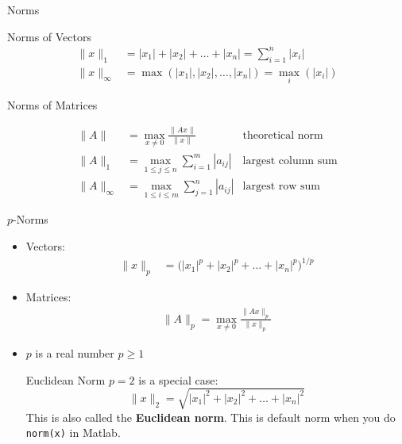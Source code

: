 \documentclass[10pt]{beamer}
\begin{document}
\begin{frame}[shrink]{Norms}

{}

\begin{block}{Norms of Vectors}
\begin{align*}
    \|x\|_{1} &= |x_1| + |x_2| + \ldots + |x_n| = \sum_{i=1}^{n}{|x_i|}\\
    \|x\|_{\infty} &= \max \left(|x_1|, |x_2|, \ldots, |x_n| \right)
                      = \underset{i}{\max} \left( |x_i| \right)
\end{align*}
\end{block}

\begin{block}{Norms of Matrices}
    
\begin{align*}
  \|A\| &= \max_{x\ne 0} \frac{\|Ax\|}{\|x\|} & \text{theoretical norm}\\
  \|A\|_1 &= \max_{1\leq j \leq n} \sum_{i=1}^{m}|a_{ij}| &\text{largest column sum}\\
  \|A\|_{\infty} &= \max_{1\leq i \leq m} \sum_{j=1}^{n}|a_{ij}| &\text{largest row sum}
\end{align*}
\end{block}
\end{frame}
\begin{frame}{$p$-Norms}
\begin{itemize}
    \item Vectors:
\begin{align*}
    \|x\|_{p} &= \bigl( |x_1|^p + |x_2|^p + \ldots + |x_n|^p \bigr)^{1/p}
\end{align*}
\item Matrices:
\begin{align*}
  \|A\|_p = \max_{x\ne 0} \frac{\|Ax\|_p}{\|x\|_p}
\end{align*}
    \item $p$ is a real number $p\ge 1$\\[3mm]

    \begin{block}{Euclidean Norm}
    $p=2$ is a special case: 
    $$
    \|x\|_{2} = \sqrt{ |x_1|^2 + |x_2|^2 + \ldots + |x_n|^2 }
    $$
    This is also called the \textbf{Euclidean norm}. This is default norm when you do \texttt{norm(x)} in Matlab. 
    \end{block}
\end{itemize}
\end{frame}
\end{document}

